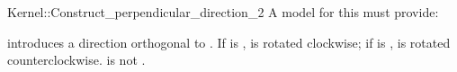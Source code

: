 \begin{ccRefFunctionObjectConcept}{Kernel::Construct_perpendicular_direction_2}
A model for this must provide:


            {introduces a direction orthogonal to . If  is
             ,  is rotated clockwise; if  is
             ,  is rotated counterclockwise.
             \ccPrecond {} is not .}

\end{ccRefFunctionObjectConcept}
